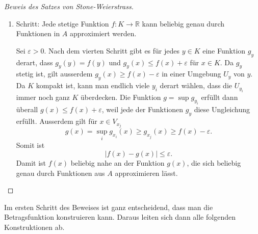 \begin{proof}[Beweis des Satzes von Stone-Weierstrass]
\begin{enumerate}
Zu jedem $z\in K$ gibt es eine Funktion $h_z\in A$ mit
$h_z(x)=f(x)$ und $h_z(z) \le f(z)+\frac12\varepsilon$.
Wegen der Stetigkeit von $h_z$ gibt es eine Umgebung $V_z$ von $z$, in der
immer noch gilt $h_z(y)\le f(y)+\varepsilon$ für $y\in V_z$.
Wegen der Kompaktheit von $K$ kann man endlich viele Punkte $z_i$ wählen
derart, dass die $V_{z_i}$ immer noch $K$ überdecken.
Dann erfüllt die Funktion
\(
g(z) = \inf h_{z_i}
\)
die Bedingungen $g(x) = f(x)$ und für $z\in V_{z_i}$
\[
g(z) = \inf_{j} h_{z_j}(z) \le h_{z_i}(z) \le f(z)+\varepsilon.
\]
Ausserdem ist $g(z)$ nach dem zweiten Schritt beliebig genau durch
Funktionen in $A$ approximierbar.
\item Schritt: Jede stetige Funktion $f\colon K\to\mathbb{R}$ kann
beliebig genau durch Funktionen in $A$ approximiert werden.

Sei $\varepsilon > 0$.
Nach dem vierten Schritt gibt es für jedes $y\in K$ eine Funktion $g_y$
derart, dass $g_y(y)=f(y)$  und $g_y(x) \le f(x) + \varepsilon$ für
$x\in K$.
Da $g_y$ stetig ist, gilt ausserdem $g_y(x) \ge f(x) -\varepsilon$ in
einer Umgebung $U_y$ von $y$.
Da $K$ kompakt ist, kann man endlich viele $y_i$ derart wählen,
dass die $U_{y_i}$ immer noch ganz $K$ überdecken.
Die Funktion $g=\sup g_{y_i}$ erfüllt dann überall $g(x) \le f(x)+\varepsilon$,
weil jede der Funktionen $g_y$ diese Ungleichung erfüllt.
Ausserdem gilt für $x\in V_{x_j}$
\[
g(x) = \sup_i g_{x_i}(x) \ge g_{x_j}(x) \ge f(x)-\varepsilon.
\]
Somit ist
\[
|f(x)-g(x)| \le \varepsilon.
\]
Damit ist $f(x)$ beliebig nahe an der Funktion $g(x)$, die sich 
beliebig genau durch Funktionen aus $A$ approximieren lässt.
\qedhere
\end{enumerate}
\end{proof}

Im ersten Schritt des Beweises ist ganz entscheidend, dass man die
Betragsfunktion konstruieren kann.
Daraus leiten sich dann alle folgenden Konstruktionen ab.

